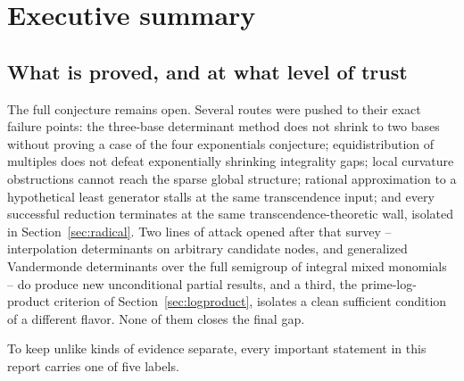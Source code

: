 \documentclass[11pt,oneside]{article}
\theoremstyle{definition}
\theoremstyle{remark}
\begin{document}
\tableofcontents
\clearpage
{}
\section{Executive summary}
\label{sec:executive}

\subsection{What is proved, and at what level of trust}
\label{ex:trust}

The full conjecture remains open.  Several routes were pushed to their exact failure points:
the three-base determinant method does not shrink to two bases without proving a case of the
four exponentials conjecture; equidistribution of multiples does not defeat exponentially
shrinking integrality gaps; local curvature obstructions cannot reach the sparse global
structure; rational approximation to a hypothetical least generator stalls at the same
transcendence input; and every successful reduction terminates at the same
transcendence-theoretic wall, isolated in Section~\ref{sec:radical}.  Two lines of attack
opened after that survey -- interpolation determinants on arbitrary candidate nodes, and
generalized Vandermonde determinants over the full semigroup of integral mixed monomials --
do produce new unconditional partial results, and a third, the prime-log-product criterion of
Section~\ref{sec:logproduct}, isolates a clean sufficient condition of a different flavor.
None of them closes the final gap.

To keep unlike kinds of evidence separate, every important statement in this report carries
one of five labels.
\end{document}
